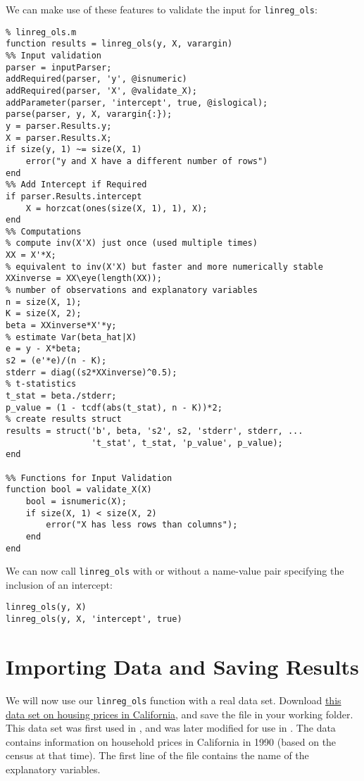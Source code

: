 \documentclass[12pt, a4paper]{article}
\begin{document}
We can make use of these features to validate the input for \texttt{linreg\_ols}:
\lstset{language=matlab,label= ,caption= ,captionpos=b,firstnumber=1,numbers=left,style=Matlab-editor}
\begin{lstlisting}
% linreg_ols.m
function results = linreg_ols(y, X, varargin)
%% Input validation
parser = inputParser;
addRequired(parser, 'y', @isnumeric)
addRequired(parser, 'X', @validate_X);
addParameter(parser, 'intercept', true, @islogical);
parse(parser, y, X, varargin{:});
y = parser.Results.y;
X = parser.Results.X;
if size(y, 1) ~= size(X, 1)
    error("y and X have a different number of rows")
end
%% Add Intercept if Required
if parser.Results.intercept
    X = horzcat(ones(size(X, 1), 1), X);
end
%% Computations
% compute inv(X'X) just once (used multiple times)
XX = X'*X;
% equivalent to inv(X'X) but faster and more numerically stable
XXinverse = XX\eye(length(XX));
% number of observations and explanatory variables
n = size(X, 1);
K = size(X, 2);
beta = XXinverse*X'*y;
% estimate Var(beta_hat|X)
e = y - X*beta;
s2 = (e'*e)/(n - K);
stderr = diag((s2*XXinverse)^0.5);
% t-statistics
t_stat = beta./stderr;
p_value = (1 - tcdf(abs(t_stat), n - K))*2;
% create results struct
results = struct('b', beta, 's2', s2, 'stderr', stderr, ...
                 't_stat', t_stat, 'p_value', p_value);
end

%% Functions for Input Validation
function bool = validate_X(X)
    bool = isnumeric(X);
    if size(X, 1) < size(X, 2)
        error("X has less rows than columns");
    end
end
\end{lstlisting}
We can now call \texttt{linreg\_ols} with or without a name-value pair specifying the inclusion of an intercept:
\lstset{language=matlab,label= ,caption= ,captionpos=b,firstnumber=1,numbers=left,style=Matlab-editor}
\begin{lstlisting}
linreg_ols(y, X)
linreg_ols(y, X, 'intercept', true)
\end{lstlisting}
\section{Importing Data and Saving Results}
\label{sec:org2520fd5}
We will now use our \texttt{linreg\_ols} function with a real data set.
Download \href{https://raw.githubusercontent.com/Salompas/handson-ml/master/datasets/housing/housing.csv}{this data set on housing prices in California}, and save the file in your working folder.
This data set was first used in \citet{PB1997}, and was later modified for use in \citet{G2017}.
The data contains information on household prices in California in 1990 (based on the census at that time).
The first line of the file contains the name of the explanatory variables.
\end{document}

